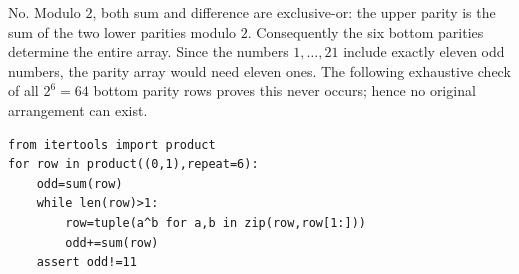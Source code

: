 No. Modulo $2$, both sum and difference are exclusive-or: the upper parity is the sum of the two lower parities modulo $2$. Consequently the six bottom parities determine the entire array. Since the numbers $1,\ldots,21$ include exactly eleven odd numbers, the parity array would need eleven ones. The following exhaustive check of all $2^6=64$ bottom parity rows proves this never occurs; hence no original arrangement can exist.
\begin{verbatim}
from itertools import product
for row in product((0,1),repeat=6):
    odd=sum(row)
    while len(row)>1:
        row=tuple(a^b for a,b in zip(row,row[1:]))
        odd+=sum(row)
    assert odd!=11
\end{verbatim}

